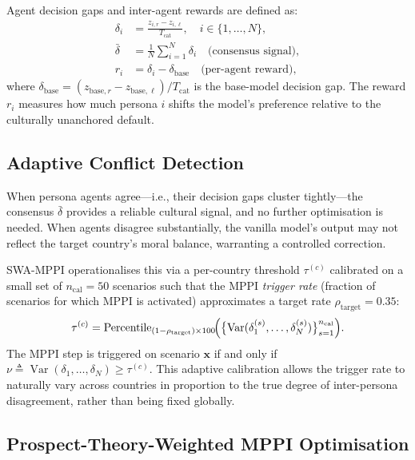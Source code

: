 \documentclass{article}
\begin{document}
Agent decision gaps and inter-agent rewards are defined as:
\begin{align}
  \delta_i &= \frac{z_{i,r} - z_{i,\ell}}{T_{\text{cat}}}, \quad i \in \{1, \ldots, N\},
  \label{eq:gap} \\
  \bar{\delta} &= \frac{1}{N}\sum_{i=1}^{N} \delta_i \quad \text{(consensus signal)},
  \label{eq:consensus} \\
  r_i &= \delta_i - \delta_{\text{base}} \quad \text{(per-agent reward)},
  \label{eq:reward}
\end{align}
where $\delta_{\text{base}} = (z_{\text{base},r} - z_{\text{base},\ell})/T_{\text{cat}}$
is the base-model decision gap. The reward $r_i$ measures how much persona $i$ shifts
the model's preference relative to the culturally unanchored default.

\subsection{Adaptive Conflict Detection}
\label{sec:method:tau}

When persona agents agree---i.e., their decision gaps cluster tightly---the consensus
$\bar{\delta}$ provides a reliable cultural signal, and no further optimisation is
needed. When agents disagree substantially, the vanilla model's output may not reflect
the target country's moral balance, warranting a controlled correction.

SWA-MPPI operationalises this via a per-country threshold $\tau^{(c)}$ calibrated on a
small set of $n_{\text{cal}}=50$ scenarios such that the MPPI \emph{trigger rate}
(fraction of scenarios for which MPPI is activated) approximates a target rate
$\rho_{\text{target}}=0.35$:
\begin{equation}
  \tau^{(c)} = \operatorname{Percentile}_{(1-\rho_{\text{target}})\times 100}
  \!\Bigl(\bigl\{\operatorname{Var}(\delta_1^{(s)}, \ldots, \delta_N^{(s)})\bigr\}_{s=1}^{n_{\text{cal}}}\Bigr).
  \label{eq:tau}
\end{equation}
The MPPI step is triggered on scenario $\mathbf{x}$ if and only if
$\nu \triangleq \operatorname{Var}(\delta_1, \ldots, \delta_N) \geq \tau^{(c)}$.
This adaptive calibration allows the trigger rate to naturally vary across countries
in proportion to the true degree of inter-persona disagreement, rather than being
fixed globally.

\subsection{Prospect-Theory-Weighted MPPI Optimisation}
\label{sec:method:mppi}
\end{document}
